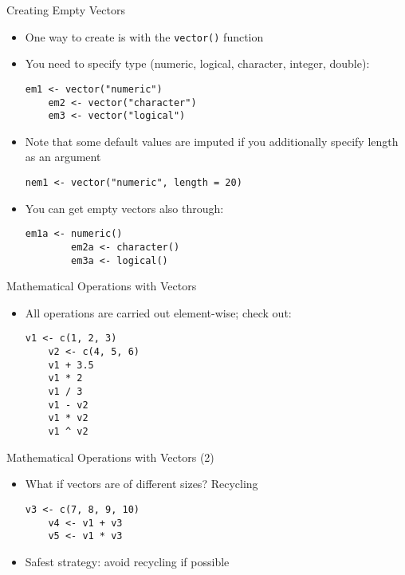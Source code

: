 \documentclass[10pt]{beamer}
\theoremstyle{definition}
\begin{document}
\begin{frame}[fragile]{Creating Empty Vectors}
\begin{itemize}
	\item One way to create is with the \texttt{vector()} function
	
	\item You need to specify type (numeric, logical, character, integer, double):
	\begin{lstlisting}[style = rstyle, breaklines]
	em1 <- vector("numeric")
	em2 <- vector("character")
	em3 <- vector("logical")
	\end{lstlisting}

	\item Note that some default values are imputed if you additionally specify length as an argument
	\begin{lstlisting}[style = rstyle, breaklines]
	nem1 <- vector("numeric", length = 20)
	\end{lstlisting}

	\item You can get empty vectors also through:
	\begin{lstlisting}[style = rstyle, breaklines]
		em1a <- numeric()
		em2a <- character()
		em3a <- logical()
	\end{lstlisting}
\end{itemize}
\end{frame}


\begin{frame}[fragile]{Mathematical Operations with Vectors}
\begin{itemize}
	\item All operations are carried out element-wise; check out:
	\begin{lstlisting}[style = rstyle, breaklines]
	v1 <- c(1, 2, 3)
	v2 <- c(4, 5, 6)
	v1 + 3.5
	v1 * 2
	v1 / 3
	v1 - v2
	v1 * v2
	v1 ^ v2
	\end{lstlisting}
\end{itemize}
\end{frame}

\begin{frame}[fragile]{Mathematical Operations with Vectors (2)}
\begin{itemize}
	\item What if vectors are of different sizes? Recycling
	\begin{lstlisting}[style = rstyle, breaklines]
	v3 <- c(7, 8, 9, 10)
	v4 <- v1 + v3
	v5 <- v1 * v3
	\end{lstlisting}

	\item Safest strategy: avoid recycling if possible
\end{itemize}
\end{frame}
\end{document}
